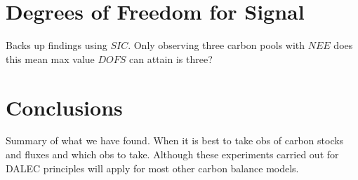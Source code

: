 \documentclass[11pt]{article}
\begin{document}
\section*{Degrees of Freedom for Signal}
Backs up findings using $SIC$. Only observing three carbon pools with $NEE$ does this mean max value $DOFS$ can attain is three? \cite{rodgers2000inverse}

\section*{Conclusions}
Summary of what we have found. When it is best to take obs of carbon stocks and fluxes and which obs to take. Although these experiments carried out for DALEC principles will apply for most other carbon balance models.


{}

\end{document}
